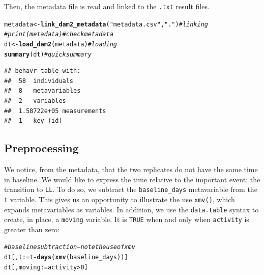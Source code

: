 \documentclass[10pt,letterpaper]{article}\usepackage[]{graphicx}\usepackage[]{color}
\makeatletter
\newcommand{\hlnum}[1]{\textcolor[rgb]{0.686,0.059,0.569}{#1}}%
\newcommand{\hlstr}[1]{\textcolor[rgb]{0.192,0.494,0.8}{#1}}%
\newcommand{\hlcom}[1]{\textcolor[rgb]{0.678,0.584,0.686}{\textit{#1}}}%
\newcommand{\hlopt}[1]{\textcolor[rgb]{0,0,0}{#1}}%
\newcommand{\hlstd}[1]{\textcolor[rgb]{0.345,0.345,0.345}{#1}}%
\newcommand{\hlkwb}[1]{\textcolor[rgb]{0.69,0.353,0.396}{#1}}%
\newcommand{\hlkwd}[1]{\textcolor[rgb]{0.737,0.353,0.396}{\textbf{#1}}}%
\newenvironment{kframe}{%
 \def\at@end@of@kframe{}%
 \ifinner\ifhmode%
  \def\at@end@of@kframe{\end{minipage}}%
  \begin{minipage}{\columnwidth}%
 \fi\fi%
 \def\FrameCommand##1{\hskip\@totalleftmargin \hskip-\fboxsep
 \colorbox{shadecolor}{##1}\hskip-\fboxsep
     \hskip-\linewidth \hskip-\@totalleftmargin \hskip\columnwidth}%
 \MakeFramed {\advance\hsize-\width
   \@totalleftmargin\z@ \linewidth\hsize
   \@setminipage}}%
 {\par\unskip\endMakeFramed%
 \at@end@of@kframe}
\newenvironment{knitrout}{}{} %
\makeatother
\begin{document}
Then, the metadata file is read and linked to the \texttt{.txt} result files.

\begin{knitrout}
\color{fgcolor}\begin{kframe}
\begin{alltt}
\hlstd{metadata} \hlkwb{<-} \hlkwd{link_dam2_metadata}\hlstd{(}\hlstr{"metadata.csv"}\hlstd{,}\hlstr{"."}\hlstd{)}    \hlcom{# linking}
\hlcom{# print(metadata)                                     # check metadata}
\hlstd{dt} \hlkwb{<-} \hlkwd{load_dam2}\hlstd{(metadata)}                             \hlcom{# loading}
\hlkwd{summary}\hlstd{(dt)}                                           \hlcom{# quick summary}
\end{alltt}
\begin{verbatim}
## behavr table with:
##  58	individuals
##  8	metavariables
##  2	variables
##  1.58722e+05	measurements
##  1	key (id)
\end{verbatim}
\end{kframe}
\end{knitrout}

\subsection*{Preprocessing}
We notice, from the metadata, that the two replicates do not have the same time in baseline.
We would like to express the time relative to the important event: the transition to \texttt{LL}. 
To do so, we subtract the \texttt{baseline\_days} metavariable from the \texttt{t} variable.
This gives us an opportunity to illustrate the use \texttt{xmv()}, which expands metavariables as variables.
In addition, we use the \texttt{data.table} syntax to create, in place, a \texttt{moving} variable.
It is \texttt{TRUE} when and only when \texttt{activity} is greater than zero:

\begin{knitrout}
\color{fgcolor}\begin{kframe}
\begin{alltt}
\hlcom{# baseline subtraction -- note the use of xmv}
\hlstd{dt[,t} \hlkwb{:=} \hlstd{t} \hlopt{-} \hlkwd{days}\hlstd{(}\hlkwd{xmv}\hlstd{(baseline_days))]}
\hlstd{dt[, moving} \hlkwb{:=}  \hlstd{activity} \hlopt{>} \hlnum{0}\hlstd{]}
\end{alltt}
\end{kframe}
\end{knitrout}
\end{document}

